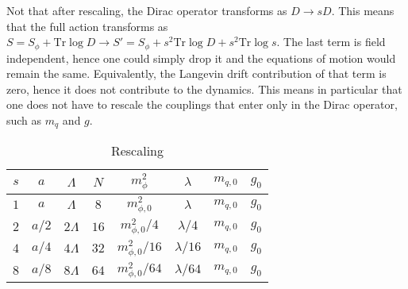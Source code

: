 Not that after rescaling, the Dirac operator transforms as $D \to s D$. This means that the full action transforms as $S = S_\phi + \text{Tr} \log D \to S' = S_\phi + s^2 \text{Tr} \log D + s^2 \text{Tr} \log s$.
The last term is field independent, hence one could simply drop it and the equations of motion would remain the same. Equivalently, the Langevin drift contribution of that term is zero, hence it does not contribute to the dynamics. This means in particular that one does not have to rescale the couplings that enter only in the Dirac operator, such as $m_q$ and $g$.

\begin{table}[]
    \centering
    \begin{tabular}{cccccccc}
        \toprule
         $s$ & $a$ & $\Lambda$ & $N$ & $m_\phi^2$ & $\lambda$ & $m_{q, 0}$ & $g_0$  \\
         \midrule 
         $1$ & $a$ & $\Lambda$ & $8$ & $m_{\phi, 0}^2$ & $\lambda$ & $m_{q, 0}$ & $g_0$ \\
         $2$ & $a/2$ & $2\Lambda$ & $16$ & $m_{\phi, 0}^2 / 4$ & $\lambda / 4$ & $m_{q, 0}$ & $g_0$ \\
         $4$ & $a/4$ & $4\Lambda$ & $32$ & $m_{\phi, 0}^2 / 16$ & $\lambda / 16$ & $m_{q, 0}$ & $g_0$ \\
         $8$ & $a/8$ & $8\Lambda$ & $64$ & $m_{\phi, 0}^2 / 64$ & $\lambda / 64$ & $m_{q, 0}$ & $g_0$ \\
         \bottomrule
    \end{tabular}
    \caption{Rescaling}
    \label{block_spin_steps}
\end{table}

\newpage

